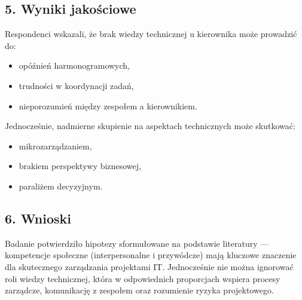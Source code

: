 \subsection*{5. Wyniki jakościowe}

Respondenci wskazali, że brak wiedzy technicznej u kierownika może prowadzić do:

\begin{itemize}
  \item opóźnień harmonogramowych,
  \item trudności w koordynacji zadań,
  \item nieporozumień między zespołem a kierownikiem.
\end{itemize}

Jednocześnie, nadmierne skupienie na aspektach technicznych może skutkować:

\begin{itemize}
  \item mikrozarządzaniem,
  \item brakiem perspektywy biznesowej,
  \item paraliżem decyzyjnym.
\end{itemize}

\subsection*{6. Wnioski}

Badanie potwierdziło hipotezy sformułowane na podstawie literatury — kompetencje społeczne (interpersonalne i przywódcze) mają kluczowe znaczenie dla skutecznego zarządzania projektami IT. Jednocześnie nie można ignorować roli wiedzy technicznej, która w odpowiednich proporcjach wspiera procesy zarządcze, komunikację z zespołem oraz rozumienie ryzyka projektowego.

\printbibliography




